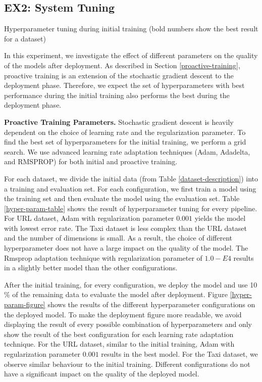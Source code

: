 \subsection{EX2: System Tuning}
\begin{table*}[t]
\centering
\begin{adjustbox}{max width=\textwidth}

\end{adjustbox}
\caption{Hyperparameter tuning during initial training (bold numbers show the best result for a dataset)}
\label{hyper-param-table}
\end{table*}

In this experiment, we investigate the effect of different parameters on the quality of the models after deployment.
As described in Section \ref{proactive-training}, proactive training is an extension of the stochastic gradient descent to the deployment phase.
Therefore, we expect the set of hyperparameters with best performance during the initial training also performs the best during the deployment phase.

\textbf{Proactive Training Parameters. }
Stochastic gradient descent is heavily dependent on the choice of learning rate and the regularization parameter.
To find the best set of hyperparameters for the initial training, we perform a grid search.
We use advanced learning rate adaptation techniques (Adam, Adadelta, and RMSPROP) for both initial and proactive training.

For each dataset, we divide the initial data (from Table \ref{dataset-description}) into a training and evaluation set.
For each configuration, we first train a model using the training set and then evaluate the model using the evaluation set.
Table \ref{hyper-param-table} shows the result of hyperparameter tuning for every pipeline.
For URL dataset, Adam with regularization parameter $0.001$ yields the model with lowest error rate.
The Taxi dataset is less complex than the URL dataset and the number of dimensions is small.
As a result, the choice of different hyperparameter does not have a large impact on the quality of the model.
The Rmsprop adaptation technique with regularization parameter of $1.0-E4$ results in a slightly better model than the other configurations.

After the initial training, for every configuration, we deploy the model and use 10 \% of the remaining data to evaluate the model after deployment.
Figure \ref{hyper-param-figure} shows the results of the different hyperparameter configurations on the deployed model.
To make the deployment figure more readable, we avoid displaying the result of every possible combination of hyperparameters and only show the result of the best configuration for each learning rate adaptation technique.
For the URL dataset, similar to the initial training, Adam with regularization parameter $0.001$ results in the best model.
For the Taxi dataset, we observe similar behaviour to the initial training.
Different configurations do not have a significant impact on the quality of the deployed model.


